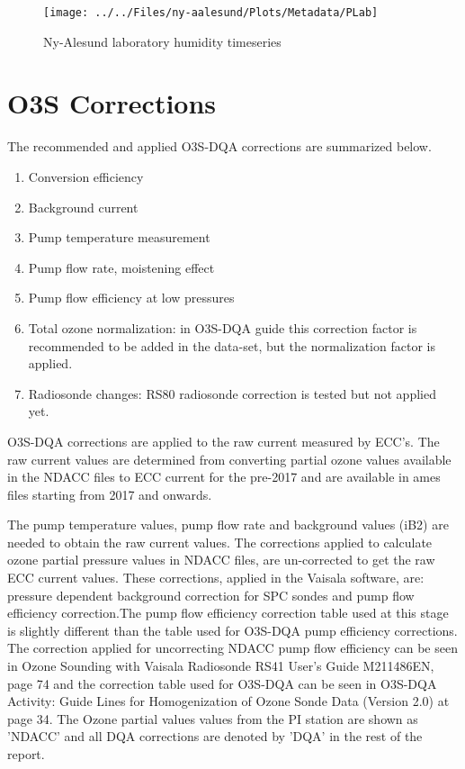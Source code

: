 \documentclass{article}
\begin{document}
\begin{figure}
\centering
\texttt{[image: ../../Files/ny-aalesund/Plots/Metadata/PLab]}
\caption{Ny-Alesund laboratory humidity timeseries}
\label{fig:PLab}
\end{figure}

\section{O3S Corrections}
\label{sec:v04}


The recommended and applied O3S-DQA corrections are summarized below.
\begin{enumerate}
\item Conversion efficiency
\item Background current
\item Pump temperature measurement
\item Pump flow rate, moistening effect
\item Pump flow efficiency at low pressures
\item Total ozone normalization: in O3S-DQA guide this correction factor is recommended to be added in the data-set,
but the normalization factor is applied.
\item Radiosonde changes: RS80 radiosonde correction is tested but not applied yet.
\end{enumerate}


O3S-DQA corrections are applied to the raw current measured by ECC's. The raw current values are
determined from converting partial ozone values available
in the NDACC files to ECC current for the pre-2017 and are available in ames files starting from 2017
and onwards.

The pump temperature values, pump flow rate and background values (iB2) are needed
to obtain the raw current values.
The corrections applied to calculate ozone partial pressure values in NDACC files, are un-corrected to
get the raw ECC current values. These corrections, applied in the Vaisala software, are:
pressure dependent background correction for SPC sondes and pump flow
efficiency correction.The pump flow efficiency correction table used at this stage is slightly different than
the table used for O3S-DQA pump efficiency corrections.
The correction applied for uncorrecting NDACC pump flow efficiency can be seen in Ozone Sounding with Vaisala
Radiosonde RS41 User's Guide M211486EN, page 74 and the correction table
used for O3S-DQA can be seen in O3S-DQA Activity: Guide Lines for Homogenization of Ozone Sonde Data (Version 2.0)
at page 34.
The Ozone partial values values from the PI station are shown as
'NDACC' and all DQA corrections are denoted by 'DQA'
in the rest of the report.
\end{document}
